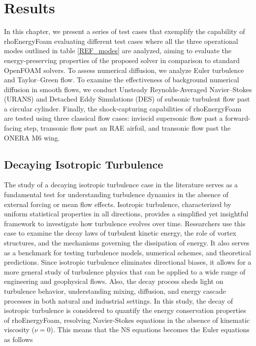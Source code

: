 \documentclass[a5paper]{sapthesis}
\begin{document}
	\chapter{Results}
	\label{chap:results}
	
	In this chapter, we present a series of test cases that exemplify the capability of rhoEnergyFoam evaluating different test cases where all the three operational modes outlined in table \ref{REF_modes} are analyzed, aiming to evaluate the energy-preserving properties of the proposed solver in comparison to standard OpenFOAM solvers. To assess numerical diffusion, we analyze Euler turbulence and Taylor–Green flow. To examine the effectiveness of background numerical diffusion in smooth flows, we conduct Unsteady Reynolds-Averaged Navier–Stokes (URANS) and Detached Eddy Simulations (DES) of subsonic turbulent flow past a circular cylinder. Finally, the shock-capturing capabilities of rhoEnergyFoam are tested using three classical flow cases: inviscid supersonic flow past a forward-facing step, transonic flow past an RAE airfoil, and transonic flow past the ONERA M6 wing.
	
	\section{Decaying Isotropic Turbulence}
	The study of a decaying isotropic turbulence case in the literature serves as a fundamental test for understanding turbulence dynamics in the absence of external forcing or mean flow effects. Isotropic turbulence, characterized by uniform statistical properties in all directions, provides a simplified yet insightful framework to investigate how turbulence evolves over time. Researchers use this case to examine the decay laws of turbulent kinetic energy, the role of vortex structures, and the mechanisms governing the dissipation of energy. It also serves as a benchmark for testing turbulence models, numerical schemes, and theoretical predictions. Since isotropic turbulence eliminates directional biases, it allows for a more general study of turbulence physics that can be applied to a wide range of engineering and geophysical flows. Also, the decay process sheds light on turbulence behavior, understanding mixing, diffusion, and energy cascade processes in both natural and industrial settings.
	In this study, the decay of isotropic turbulence is considered to quantify the energy conservation properties of rhoEnergyFoam, resolving Navier-Stokes equations in the absence of kinematic viscosity ($\nu = 0$). This means that the NS equations becomes the Euler equations as follows
	
\end{document}
